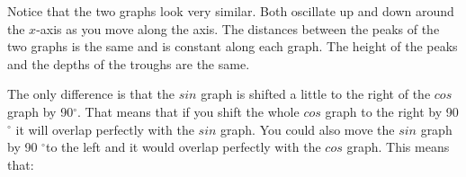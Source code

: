         \label{m39414*id88718}Notice that the two graphs look very similar. Both oscillate up and down around the \begin{math}x\end{math}-axis as you move along the axis. The distances between the peaks of the two graphs is the same and is constant along each graph. The height of the peaks and the depths of the troughs are the same.\par 
        \label{m39414*id88733}The only difference is that the \begin{math}sin\end{math} graph is shifted a little to the right of the \begin{math}cos\end{math} graph by 90\begin{math}{}^{\circ }\end{math}. That means that if you shift the whole \begin{math}cos\end{math} graph to the right by 90 \begin{math}{}^{\circ }\end{math} it will overlap perfectly with the \begin{math}sin\end{math} graph. You could also move the \begin{math}sin\end{math} graph by 90 \begin{math}{}^{\circ }\end{math}to the left and it would overlap perfectly with the \begin{math}cos\end{math} graph. This means that:\par 
        \label{m39414*id88844}\nopagebreak\noindent{}
